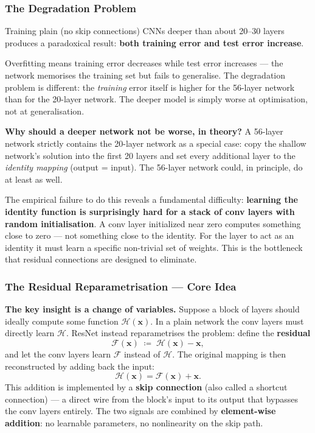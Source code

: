 \documentclass[11pt,a4paper]{article}
\newcommand{\term}[1]{\textcolor{DefGreen}{\textbf{#1}}\index{#1}}
\begin{document}
\subsubsection{The Degradation Problem}

Training plain (no skip connections) CNNs deeper than about 20--30 layers produces a
paradoxical result: \textbf{both training error and test error increase}.

\begin{warnbox}
Overfitting means training error decreases while test error increases — the network memorises
the training set but fails to generalise.  The degradation problem is different: the \emph{training}
error itself is higher for the 56-layer network than for the 20-layer network.  The deeper model
is simply worse at optimisation, not at generalisation.
\end{warnbox}

\textbf{Why should a deeper network not be worse, in theory?}
A 56-layer network strictly contains the 20-layer network as a special case: copy the
shallow network's solution into the first 20 layers and set every additional layer to the
\emph{identity mapping} (output = input).  The 56-layer network could, in principle, do at
least as well.

The empirical failure to do this reveals a fundamental difficulty: \textbf{learning the identity
function is surprisingly hard for a stack of conv layers with random initialisation}.  A conv
layer initialized near zero computes something close to zero — not something close to the
identity.  For the layer to act as an identity it must learn a specific non-trivial set of
weights.  This is the bottleneck that residual connections are designed to eliminate.

\subsubsection{The Residual Reparametrisation — Core Idea}

\textbf{The key insight is a change of variables.}  Suppose a block of layers should ideally
compute some function $\mathcal{H}(\mathbf{x})$.  In a plain network the conv layers must
directly learn $\mathcal{H}$.  ResNet instead reparametrises the problem: define the
\term{residual}
\[
  \mathcal{F}(\mathbf{x}) \;\coloneqq\; \mathcal{H}(\mathbf{x}) - \mathbf{x},
\]
and let the conv layers learn $\mathcal{F}$ instead of $\mathcal{H}$.  The original mapping
is then reconstructed by adding back the input:
\[
  \mathcal{H}(\mathbf{x}) = \mathcal{F}(\mathbf{x}) + \mathbf{x}.
\]
This addition is implemented by a \term{skip connection} (also called a shortcut connection)
— a direct wire from the block's input to its output that bypasses the conv layers entirely.
The two signals are combined by \textbf{element-wise addition}: no learnable parameters, no
nonlinearity on the skip path.
\end{document}
